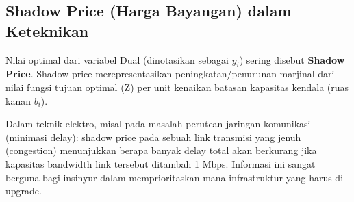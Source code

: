\documentclass[11pt, a4paper]{article}
\begin{document}
\subsection{Shadow Price (Harga Bayangan) dalam Keteknikan}
Nilai optimal dari variabel Dual (dinotasikan sebagai $y_i$) sering disebut \textbf{Shadow Price}. Shadow price merepresentasikan peningkatan/penurunan marjinal dari nilai fungsi tujuan optimal (Z) per unit kenaikan batasan kapasitas kendala (ruas kanan $b_i$).

Dalam teknik elektro, misal pada masalah perutean jaringan komunikasi (minimasi delay): shadow price pada sebuah link transmisi yang jenuh (congestion) menunjukkan berapa banyak delay total akan berkurang jika kapasitas bandwidth link tersebut ditambah 1 Mbps. Informasi ini sangat berguna bagi insinyur dalam memprioritaskan mana infrastruktur yang harus di-upgrade.
\end{document}
